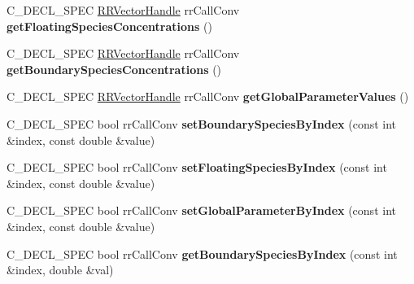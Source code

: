 \begin{DoxyCompactItemize}
\item 
\hypertarget{group__loadsave_ga0db8fe5f89985f27ea4ddb3c595b16fd}{
\-C\-\_\-\-D\-E\-C\-L\-\_\-\-S\-P\-E\-C \hyperlink{rr__c__types_8h_aea46a16752b0ae2cd95c009030ee630e}{\-R\-R\-Vector\-Handle} \*
rr\-Call\-Conv {\bfseries get\-Floating\-Species\-Concentrations} ()}
\label{group__loadsave_ga0db8fe5f89985f27ea4ddb3c595b16fd}

\item 
\hypertarget{group__loadsave_gaae9b6b75211923bcf6f7196fe707c631}{
\-C\-\_\-\-D\-E\-C\-L\-\_\-\-S\-P\-E\-C \hyperlink{rr__c__types_8h_aea46a16752b0ae2cd95c009030ee630e}{\-R\-R\-Vector\-Handle} \*
rr\-Call\-Conv {\bfseries get\-Boundary\-Species\-Concentrations} ()}
\label{group__loadsave_gaae9b6b75211923bcf6f7196fe707c631}

\item 
\hypertarget{group__loadsave_gaf4be0a5e72db408248569a1d3e28c1f0}{
\-C\-\_\-\-D\-E\-C\-L\-\_\-\-S\-P\-E\-C \hyperlink{rr__c__types_8h_aea46a16752b0ae2cd95c009030ee630e}{\-R\-R\-Vector\-Handle} \*
rr\-Call\-Conv {\bfseries get\-Global\-Parameter\-Values} ()}
\label{group__loadsave_gaf4be0a5e72db408248569a1d3e28c1f0}

\item 
\hypertarget{group__loadsave_gabb6764fa48d0b3f2ca3b38e391479347}{
\-C\-\_\-\-D\-E\-C\-L\-\_\-\-S\-P\-E\-C bool rr\-Call\-Conv {\bfseries set\-Boundary\-Species\-By\-Index} (const int \&index, const double \&value)}
\label{group__loadsave_gabb6764fa48d0b3f2ca3b38e391479347}

\item 
\hypertarget{group__loadsave_gaf4a5a4d9b1ecf60d4b98189b4bcf2543}{
\-C\-\_\-\-D\-E\-C\-L\-\_\-\-S\-P\-E\-C bool rr\-Call\-Conv {\bfseries set\-Floating\-Species\-By\-Index} (const int \&index, const double \&value)}
\label{group__loadsave_gaf4a5a4d9b1ecf60d4b98189b4bcf2543}

\item 
\hypertarget{group__loadsave_ga65d9546856e5526fc403539903039f8e}{
\-C\-\_\-\-D\-E\-C\-L\-\_\-\-S\-P\-E\-C bool rr\-Call\-Conv {\bfseries set\-Global\-Parameter\-By\-Index} (const int \&index, const double \&value)}
\label{group__loadsave_ga65d9546856e5526fc403539903039f8e}

\item 
\hypertarget{group__loadsave_gaccee3467307dbcedd031c1dc2cf57606}{
\-C\-\_\-\-D\-E\-C\-L\-\_\-\-S\-P\-E\-C bool rr\-Call\-Conv {\bfseries get\-Boundary\-Species\-By\-Index} (const int \&index, double \&val)}
\label{group__loadsave_gaccee3467307dbcedd031c1dc2cf57606}


\end{DoxyCompactItemize}
